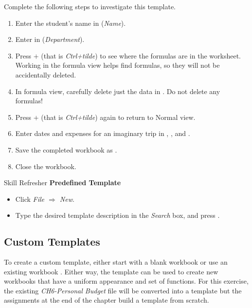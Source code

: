 Complete the following steps to investigate this template.

\begin{enumerate}
	\item Enter the student's name in  (\textit{Name}).
	\item Enter  in  (\textit{Department}).
	\item Press $+$\fmtKeystroke{$ \sim $} (that is \textit{Ctrl+tilde}) to see where the formulas are in the worksheet. Working in the formula view helps find formulas, so they will not be accidentally deleted.
	\item In formula view, carefully delete just the data in . Do not delete any formulas!
	\item Press $+$\fmtKeystroke{$ \sim $} (that is \textit{Ctrl+tilde}) again to return to Normal view.
	\item Enter dates and expenses for an imaginary trip in , , and .
	\item Save the completed workbook as . 
	\item Close the workbook.
\end{enumerate}

\begin{center}
	\begin{sklbox}{Skill Refresher}
		\textbf{Predefined Template}
		\\
		\begin{itemize}
			\setlength{\itemsep}{0pt}
			\setlength{\parskip}{0pt}
			\setlength{\parsep}{0pt}

			\item Click \textit{File $ \Rightarrow $ New}.
			\item Type the desired template description in the \textit{Search} box, and press .
			
		\end{itemize}
	\end{sklbox}
\end{center}

\subsection{Custom Templates}

To create a custom template, either start with a blank workbook or use an existing workbook . Either way, the template can be used to create new workbooks that have a uniform appearance and set of functions. For this exercise, the existing \textit{CH6-Personal Budget} file will be converted into a template but the assignments at the end of the chapter build a template from scratch.

